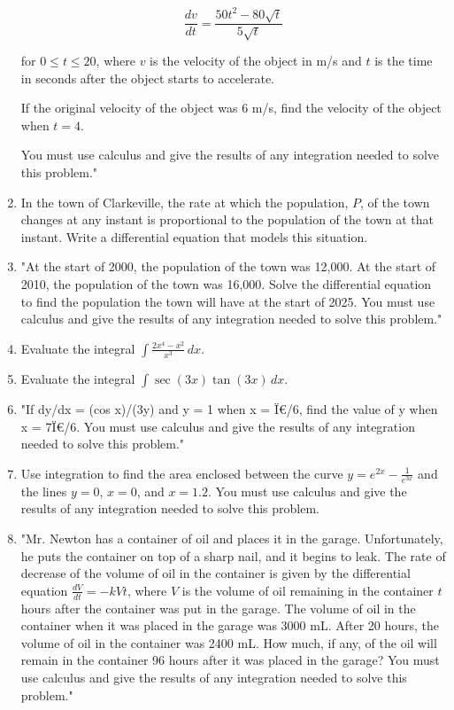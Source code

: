 \documentclass{article}
\begin{document}
\begin{enumerate}
\[ \frac{dv}{dt} = \frac{50t^2 - 80\sqrt{t}}{5\sqrt{t}} \]

for \( 0 \leq t \leq 20 \), where \( v \) is the velocity of the object in m/s and \( t \) is the time in seconds after the object starts to accelerate.

If the original velocity of the object was 6 m/s, find the velocity of the object when \( t = 4 \).

You must use calculus and give the results of any integration needed to solve this problem."
\vspace{3cm}
\item In the town of Clarkeville, the rate at which the population, \( P \), of the town changes at any instant is proportional to the population of the town at that instant. Write a differential equation that models this situation.
\vspace{3cm}
\item "At the start of 2000, the population of the town was 12,000. At the start of 2010, the population of the town was 16,000. Solve the differential equation to find the population the town will have at the start of 2025. You must use calculus and give the results of any integration needed to solve this problem."
\vspace{3cm}
\item Evaluate the integral \(\int \frac{2x^4 - x^2}{x^3} \, dx\).
\vspace{3cm}
\item Evaluate the integral \(\int \sec(3x) \tan(3x) \, dx\).
\vspace{3cm}
\item "If dy/dx = (cos x)/(3y) and y = 1 when x = Ï€/6, find the value of y when x = 7Ï€/6. You must use calculus and give the results of any integration needed to solve this problem."
\vspace{3cm}
\item Use integration to find the area enclosed between the curve \( y = e^{2x} - \frac{1}{e^{3x}} \) and the lines \( y = 0 \), \( x = 0 \), and \( x = 1.2 \). You must use calculus and give the results of any integration needed to solve this problem.
\vspace{3cm}
\item "Mr. Newton has a container of oil and places it in the garage. Unfortunately, he puts the container on top of a sharp nail, and it begins to leak. The rate of decrease of the volume of oil in the container is given by the differential equation \(\frac{dV}{dt} = -kVt\), where \(V\) is the volume of oil remaining in the container \(t\) hours after the container was put in the garage. The volume of oil in the container when it was placed in the garage was 3000 mL. After 20 hours, the volume of oil in the container was 2400 mL. How much, if any, of the oil will remain in the container 96 hours after it was placed in the garage? You must use calculus and give the results of any integration needed to solve this problem."

\end{enumerate}
\end{document}

